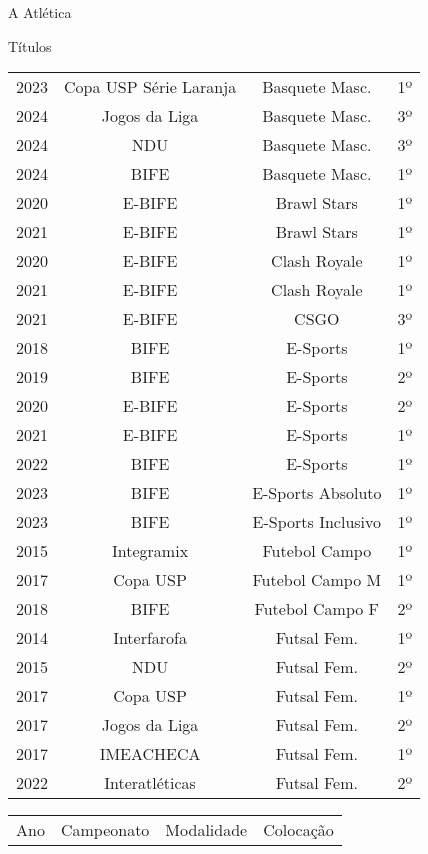 \begin{secao}{A Atlética}
\begin{subsecao}{Títulos}
\begin{center}
\begin{tabular}{|c|c|c|c|}
    2023 & Copa USP Série Laranja & Basquete Masc. & 1º\\
    2024 & Jogos da Liga  & Basquete Masc.  & 3º\\
    2024 & NDU            & Basquete Masc.  & 3º\\
    2024 & BIFE           & Basquete Masc.  & 1º\\
    2020 & E-BIFE         & Brawl Stars     & 1º\\
    2021 & E-BIFE         & Brawl Stars     & 1º\\
    2020 & E-BIFE         & Clash Royale    & 1º\\
    2021 & E-BIFE         & Clash Royale    & 1º\\
    2021 & E-BIFE         & CSGO            & 3º\\
    2018 & BIFE           & E-Sports        & 1º\\
    2019 & BIFE           & E-Sports        & 2º\\
    2020 & E-BIFE         & E-Sports        & 2º\\
    2021 & E-BIFE         & E-Sports        & 1º\\
    2022 & BIFE           & E-Sports        & 1º\\
    2023 & BIFE           & E-Sports Absoluto  & 1º\\
    2023 & BIFE           & E-Sports Inclusivo & 1º\\
    2015 & Integramix     & Futebol Campo   & 1º\\
    2017 & Copa USP       & Futebol Campo M & 1º\\
    2018 & BIFE           & Futebol Campo F & 2º\\
    2014 & Interfarofa    & Futsal Fem.     & 1º\\
    2015 & NDU            & Futsal Fem.     & 2º\\
    2017 & Copa USP       & Futsal Fem.     & 1º\\
    2017 & Jogos da Liga  & Futsal Fem.     & 2º\\
    2017 & IMEACHECA      & Futsal Fem.     & 1º\\
    2022 & Interatléticas & Futsal Fem.     & 2º\\
    \hline
         \end{tabular}
\end{center}
\begin{center}
\begin{tabular}{|c|c|c|c|}
  \hline
  Ano & Campeonato & Modalidade & Colocação\\

\end{tabular}
\end{center}
\end{subsecao}
\end{secao}
